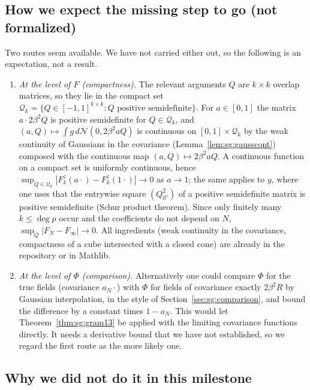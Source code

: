 \subsection*{How we expect the missing step to go (not formalized)}

Two routes seem available. We have not carried either out, so the following is an expectation, not a result.

\begin{enumerate}
\item \emph{At the level of $F$ (compactness).} The relevant arguments $Q$ are $k\times k$ overlap matrices, so they lie in the compact set $\mathcal Q_k=\{Q\in[-1,1]^{k\times k}:Q\text{ positive semidefinite}\}$. For $a\in[0,1]$ the matrix $a\cdot2\beta^2Q$ is positive semidefinite for $Q\in\mathcal Q_k$, and
$(a,Q)\mapsto\int g\,d\mathcal N(0,2\beta^2aQ)$ is continuous on $[0,1]\times\mathcal Q_k$ by the weak continuity of Gaussians in the covariance (Lemma~\ref{lem:sg:gausscont}) composed with the continuous map $(a,Q)\mapsto 2\beta^2aQ$. A continuous function on a compact set is uniformly continuous, hence
$\sup_{Q\in\mathcal Q_k}|F^z_k(a\cdot)-F^z_k(1\cdot)|\to0$ as $a\to1$; the same applies to $y$, where one uses that the entrywise square $(Q_{ll'}^2)$ of a positive semidefinite matrix is positive semidefinite (Schur product theorem). Since only finitely many $k\le\deg p$ occur and the coefficients do not depend on $N$,
$\sup_Q|F_N-F_\infty|\to0$. All ingredients (weak continuity in the covariance, compactness of a cube intersected with a closed cone) are already in the repository or in Mathlib.
\item \emph{At the level of $\Phi$ (comparison).} Alternatively one could compare $\Phi$ for the true fields (covariance $a_N\cdot$) with $\Phi$ for fields of covariance exactly $2\beta^2R$ by Gaussian interpolation, in the style of Section~\ref{sec:sg:comparison}, and bound the difference by a constant times $1-a_N$.
This would let Theorem~\ref{thm:sg:gram13} be applied with the limiting covariance functions directly. It needs a derivative bound that we have not established, so we regard the first route as the more likely one.
\end{enumerate}

\subsection*{Why we did not do it in this milestone}

